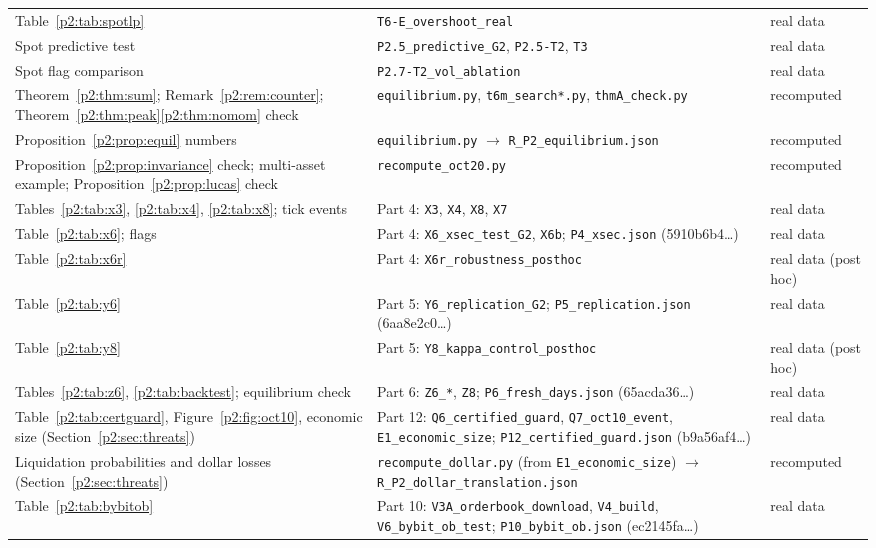 \begin{longtable}{p{}p{}p{}}
Table~\ref{p2:tab:spotlp} & \texttt{T6-E\_overshoot\_real} & real data\\
Spot predictive test & \texttt{P2.5\_predictive\_G2}, \texttt{P2.5-T2}, \texttt{T3} & real data\\
Spot flag comparison & \texttt{P2.7-T2\_vol\_ablation} & real data\\
Theorem~\ref{p2:thm:sum}; Remark~\ref{p2:rem:counter}; Theorem~\ref{p2:thm:peak}\ref{p2:thm:nomom} check & \texttt{equilibrium.py}, \texttt{t6m\_search*.py}, \texttt{thmA\_check.py} & recomputed\\
Proposition~\ref{p2:prop:equil} numbers & \texttt{equilibrium.py} $\to$ \texttt{R\_P2\_equilibrium.json} & recomputed\\
Proposition~\ref{p2:prop:invariance} check; multi-asset example; Proposition~\ref{p2:prop:lucas} check & \texttt{recompute\_oct20.py} & recomputed\\
Tables~\ref{p2:tab:x3}, \ref{p2:tab:x4}, \ref{p2:tab:x8}; tick events & Part 4: \texttt{X3}, \texttt{X4}, \texttt{X8}, \texttt{X7} & real data\\
Table~\ref{p2:tab:x6}; flags & Part 4: \texttt{X6\_xsec\_test\_G2}, \texttt{X6b}; \texttt{P4\_xsec.json} (5910b6b4\ldots) & real data\\
Table~\ref{p2:tab:x6r} & Part 4: \texttt{X6r\_robustness\_posthoc} & real data (post hoc)\\
Table~\ref{p2:tab:y6} & Part 5: \texttt{Y6\_replication\_G2}; \texttt{P5\_replication.json} (6aa8e2c0\ldots) & real data\\
Table~\ref{p2:tab:y8} & Part 5: \texttt{Y8\_kappa\_control\_posthoc} & real data (post hoc)\\
Tables~\ref{p2:tab:z6}, \ref{p2:tab:backtest}; equilibrium check & Part 6: \texttt{Z6\_*}, \texttt{Z8}; \texttt{P6\_fresh\_days.json} (65acda36\ldots) & real data\\
Table~\ref{p2:tab:certguard}, Figure~\ref{p2:fig:oct10}, economic size (Section~\ref{p2:sec:threats}) & Part 12: \texttt{Q6\_certified\_guard}, \texttt{Q7\_oct10\_event}, \texttt{E1\_economic\_size}; \texttt{P12\_certified\_guard.json} (b9a56af4\ldots) & real data\\
Liquidation probabilities and dollar losses (Section~\ref{p2:sec:threats}) & \texttt{recompute\_dollar.py} (from \texttt{E1\_economic\_size}) $\to$ \texttt{R\_P2\_dollar\_translation.json} & recomputed\\
Table~\ref{p2:tab:bybitob} & Part 10: \texttt{V3A\_orderbook\_download}, \texttt{V4\_build}, \texttt{V6\_bybit\_ob\_test}; \texttt{P10\_bybit\_ob.json} (ec2145fa\ldots) & real data\\

\end{longtable}
